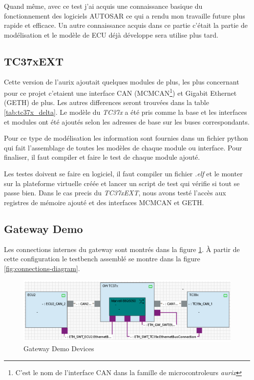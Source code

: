 Quand même, avec ce test j'ai acquis une connaissance basique du fonctionnement des logiciels AUTOSAR ce qui a rendu mon travaille future plus rapide et efficace. Un autre connaissance acquis dans ce partie c'était la partie de modélisation et le modèle de ECU déjà développe sera utilise plus tard.

\subsection{TC37xEXT}

Cette version de l'aurix ajoutait quelques modules de plus, les plus concernant pour ce projet c'etaient une interface CAN (MCMCAN\footnote{C'est le nom de l'interface CAN dans la famille de microcontroleurs \textit{aurix}}) et Gigabit Ethernet (GETH) de plus. Les autres differences seront trouv\'ees dans la table \ref{tab:tc37x_delta}. Le modèle du \textit{TC37x}\cite{aurix.tc37x} a \'et\'e pris comme la base et les interfaces et modules ont \'et\'e ajout\'es selon les adresses de base sur les buses correspondants.



Pour ce type de modélisation les information sont fournies dans un fichier python qui fait l'assemblage de toutes les modèles de chaque module ou interface. Pour finaliser, il faut compiler et faire le test de chaque module ajout\'e.

Les testes doivent se faire en logiciel, il faut compiler un fichier \textit{.elf} et le monter sur la plateforme virtuelle cr\'e\'ee et lancer un script de test qui vérifie si tout se passe bien. Dans le cas precis du \textit{TC37xEXT},  nous avons test\'e l'accès aux registres de mémoire ajout\'e et des interfaces MCMCAN et GETH.

\subsection{Gateway Demo}

Les connections internes du gateway sont montr\'es dans la figure \ref{fig:devices-diagram}. \`A partir de cette configuration le testbench assembl\'e se montre dans la figure \ref{fig:connections-diagram}. %

\begin{figure}[!htb]
 \centering
 \includegraphics[width=\textwidth]{img/GWDemoConnections.PNG}
 \caption{Gateway Demo Devices \cite{gateway-pb}}
 \label{fig:devices-diagram}
\end{figure}

